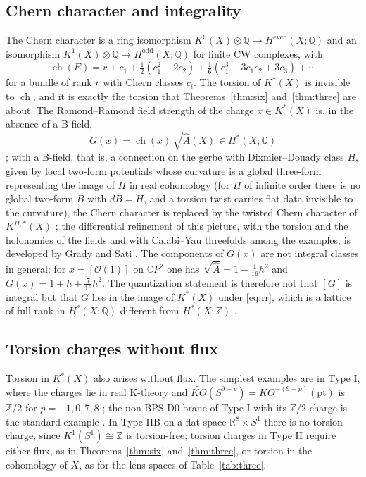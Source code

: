 \documentclass[reqno,11pt]{amsart}
\theoremstyle{definition}
\newcommand{\ZZ}{\mathbb{Z}}
\newcommand{\QQ}{\mathbb{Q}}
\newcommand{\RR}{\mathbb{R}}
\newcommand{\CC}{\mathbb{C}}
\newcommand{\ch}{\operatorname{ch}}
\newcommand{\Ahat}{\widehat{A}}
\begin{document}
\subsection{Chern character and integrality}
The Chern character is a ring isomorphism $K^0(X)\otimes\QQ\to H^{\mathrm{even}}(X;\QQ)$ and an isomorphism $K^1(X)\otimes\QQ\to H^{\mathrm{odd}}(X;\QQ)$ for finite CW complexes, with
\begin{equation}\label{eq:ch}
\ch(E)=r+c_1+\tfrac12(c_1^2-2c_2)+\tfrac16(c_1^3-3c_1c_2+3c_3)+\cdots
\end{equation}
for a bundle of rank $r$ with Chern classes $c_i$. The torsion of $K^*(X)$ is invisible to $\ch$, and it is exactly the torsion that Theorems~\ref{thm:six} and~\ref{thm:three} are about. The Ramond--Ramond field strength of the charge $x\in K^*(X)$ is, in the absence of a B-field,
\begin{equation}\label{eq:rr}
G(x)=\ch(x)\,\sqrt{\Ahat(X)}\in H^*(X;\QQ)
\end{equation}
\cite{MM97,FH00}; with a B-field, that is, a connection on the gerbe with Dixmier--Douady class $H$, given by local two-form potentials whose curvature is a global three-form representing the image of $H$ in real cohomology (for $H$ of infinite order there is no global two-form $B$ with $dB=H$, and a torsion twist carries flat data invisible to the curvature), the Chern character is replaced by the twisted Chern character of $K^{H,*}(X)$ \cite{BM00}; the differential refinement of this picture, with the torsion and the holonomies of the fields and with Calabi--Yau threefolds among the examples, is developed by Grady and Sati \cite{GS22}. The components of $G(x)$ are not integral classes in general: for $x=[\mathcal O(1)]$ on $\CC P^2$ one has $\sqrt{\Ahat}=1-\tfrac1{16}h^2$ and $G(x)=1+h+\tfrac7{16}h^2$. The quantization statement is therefore not that $[G]$ is integral but that $G$ lies in the image of $K^*(X)$ under \eqref{eq:rr}, which is a lattice of full rank in $H^*(X;\QQ)$ different from $H^*(X;\ZZ)$ \cite{FH00}.

\subsection{Torsion charges without flux}
Torsion in $K^*(X)$ also arises without flux. The simplest examples are in Type I, where the charges lie in real K-theory and $\widetilde{KO}(S^{9-p})=KO^{-(9-p)}(\mathrm{pt})$ is $\ZZ/2$ for $p=-1,0,7,8$ \cite{Wit98}; the non-BPS D0-brane of Type I with its $\ZZ/2$ charge is the standard example \cite{Sen98,Wit98}. In Type IIB on a flat space $\RR^8\times S^1$ there is no torsion charge, since $K^1(S^1)\cong\ZZ$ is torsion-free; torsion charges in Type II require either flux, as in Theorems~\ref{thm:six} and~\ref{thm:three}, or torsion in the cohomology of $X$, as for the lens spaces of Table~\ref{tab:three}.
\end{document}
